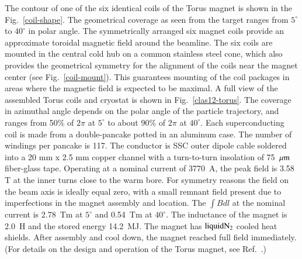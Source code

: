 \documentclass[final,3p,times,twocolumn,authoryear]{elsarticle}
\begin{document}
The contour of one of the six identical coils of the Torus magnet is shown in the  Fig.~\ref{coil-shape}. The 
geometrical coverage as seen from the target ranges from
 $5^\circ$ to $40^\circ$ in polar angle. The symmetrically arranged six magnet coils provide an approximate toroidal magnetic field around the beamline. The six coils are mounted in the central cold hub on a common
stainless steel cone, which also provides the geometrical symmetry for the alignment of the coils near the magnet center (see Fig.~\ref{coil-mount}). 
This guarantees mounting of the coil packages in areas where the magnetic field is expected to be maximal. A full 
view of the assembled Torus coils and cryostat is shown in Fig.~\ref{clas12-torus}. The coverage in azimuthal angle depends on the polar angle of the particle 
 trajectory, and ranges from 50\% of $2\pi$ at $5^\circ$ to about 90\% of $2\pi$ at $40^\circ$. Each superconducting coil 
 is made from a double-pancake potted in an aluminum case. The number of windings per pancake is 117.
The conductor is SSC outer dipole cable soldered into a 20 mm x 2.5 mm copper channel with a turn-to-turn insolation 
of 75~$\mu \rm{m}$ fiber-glass tape. 
Operating at a nominal current of 3770~A, the peak field is 3.58 T at the inner turns close to the warm bore. 
For symmetry reasons the field on the beam axis is ideally equal zero, with a small remnant field present due to 
imperfections in the magnet assembly and location. The $\int {Bdl}$ at the nominal current is 2.78~Tm at $5^\circ$ and 0.54~Tm at $40^\circ$. The inductance of the magnet is 2.0~H and the stored energy 14.2~MJ. The magnet has $\rm liquid N_2$ cooled heat shields. After assembly and cool down, the magnet reached full field immediately.  (For details on the design and operation of the Torus magnet, see Ref.~\cite{clas12-magnets}.)
\end{document}
